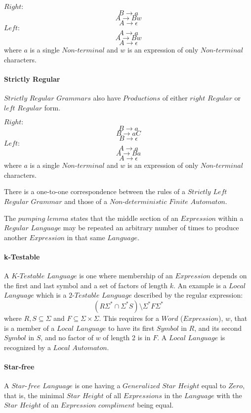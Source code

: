 \documentclass{article}
\begin{document}
$Right:$
\[
    B \rightarrow a
\]\[
    A \rightarrow Bw
\]\[
    A \rightarrow \epsilon
\]
$Left:$
\[
    A \rightarrow a
\]\[
    A \rightarrow Bw
\]\[
    A \rightarrow \epsilon
\]
where $a$ is a single $Non$-$terminal$ and $w$ is an expression of
only $Non$-$terminal$ characters.

\paragraph{Strictly Regular}
$Strictly$ $Regular$ $Grammars$ also have $Productions$ of either
$right$ $Regular$ or $left$ $Regular$ form.

$Right:$
\[
    B \rightarrow a
\]\[
    B \rightarrow aC
\]\[
    B \rightarrow \epsilon
\]
$Left:$
\[
    A \rightarrow a
\]\[
    A \rightarrow Ba
\]\[
    A \rightarrow \epsilon
\]
where $a$ is a single $Non$-$terminal$ and $w$ is an expression of
only $Non$-$terminal$ characters.

There is a one-to-one correspondence between the rules of a $Strictly$
$Left$ $Regular$ $Grammar$ and those of a $Non$-$deterministic$
$Finite$ $Automaton$.

The $pumping$ $lemma$ states that the middle section of an
$Expression$ within a $Regular$ $Language$ may be repeated an
arbitrary number of times to produce another $Expression$ in that same
$Language$.

\paragraph{k-Testable}
A $K$-$Testable$ $Language$ is one where membership of an $Expression$
depends on the first and last symbol and a set of factors of length
$k$. An example is a $Local$ $Language$ which is a $2$-$Testable$
$Language$ described by the regular expression:
\[
    (R\Sigma^* \cap \Sigma^*S)\setminus\Sigma^*F\Sigma^*
\]
where $R,S \subseteq \Sigma$ and $F \subseteq \Sigma \times
\Sigma$. This requires for a $Word$ ($Expression$), $w$, that is a
member of a $Local$ $Language$ to have its first $Symbol$ in $R$, and
its second $Symbol$ in $S$, and no factor of $w$ of length 2 is in
$F$. A $Local$ $Language$ is recognized by a $Local$ $Automaton$.

\paragraph{Star-free}
A $Star$-$free$ $Language$ is one having a $Generalized$ $Star$
$Height$ equal to $Zero$, that is, the minimal $Star$ $Height$ of all
$Expressions$ in the $Language$ with the $Star$ $Height$ of an
$Expression$ $compliment$ being equal.
\end{document}
